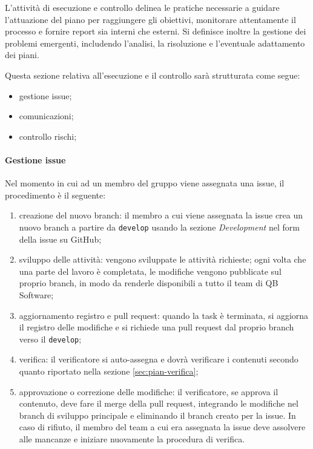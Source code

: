     L'attività di esecuzione e controllo delinea le pratiche necessarie a guidare l'attuazione del piano per raggiungere gli obiettivi, monitorare attentamente il processo e fornire report sia interni che esterni. Si definisce inoltre la gestione dei problemi emergenti,  includendo l'analisi, la risoluzione e l'eventuale adattamento dei piani.
    
    \noindent 
    Questa sezione relativa all'esecuzione e il controllo sarà strutturata come segue:
    \begin{itemize}
        \item gestione issue;
        \item comunicazioni;
        \item controllo rischi;
    \end{itemize}

    \paragraph{Gestione issue}
    Nel momento in cui ad un membro del gruppo viene assegnata una issue, il procedimento è il seguente:

    \begin{enumerate}
        \item creazione del nuovo branch: il membro a cui viene assegnata la issue crea un nuovo branch a partire da \verb|develop| usando la sezione \emph{Development} nel form della issue su GitHub;
        \item sviluppo delle attività: vengono sviluppate le attività richieste; ogni volta che una parte del lavoro è completata, le modifiche vengono pubblicate sul proprio branch, in modo da renderle disponibili a tutto il team di QB Software;
        \item aggiornamento registro e pull request: quando la task è terminata, si aggiorna il registro delle modifiche e si richiede una pull request dal proprio branch verso il \verb|develop|;
        \item verifica: il verificatore si auto-assegna e dovrà verificare i contenuti secondo quanto riportato nella sezione \ref{sec:pian-verifica};
        \item approvazione o correzione delle modifiche: il verificatore, se approva il contenuto, deve fare il merge della pull request, integrando le modifiche nel branch di sviluppo principale e eliminando il branch creato per la issue. In caso di rifiuto, il membro del team a cui era assegnata la issue deve assolvere alle mancanze e iniziare nuovamente la procedura di verifica.
    \end{enumerate}



